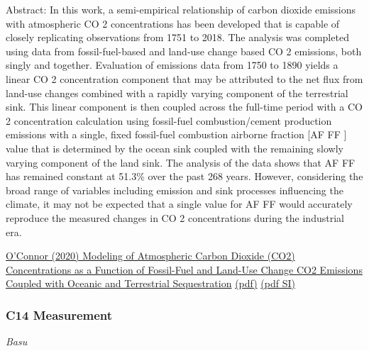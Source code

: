 \documentclass[
]{book}
\begin{document}
Abstract: In this work, a semi-empirical relationship of carbon dioxide emissions with atmospheric
CO 2 concentrations has been developed that is capable of closely replicating observations from 1751
to 2018. The analysis was completed using data from fossil-fuel-based and land-use change based
CO 2 emissions, both singly and together. Evaluation of emissions data from 1750 to 1890 yields a
linear CO 2 concentration component that may be attributed to the net flux from land-use changes
combined with a rapidly varying component of the terrestrial sink. This linear component is then
coupled across the full-time period with a CO 2 concentration calculation using fossil-fuel
combustion/cement production emissions with a single, fixed fossil-fuel combustion airborne
fraction {[}AF FF {]} value that is determined by the ocean sink coupled with the remaining slowly
varying component of the land sink. The analysis of the data shows that AF FF has remained constant
at 51.3\% over the past 268 years. However, considering the broad range of variables including
emission and sink processes influencing the climate, it may not be expected that a single value for
AF FF would accurately reproduce the measured changes in CO 2 concentrations during the industrial
era.

\href{https://www.researchgate.net/publication/341129655_Modeling_of_Atmospheric_Carbon_Dioxide_CO2_Concentrations_as_a_Function_of_Fossil-Fuel_and_Land-Use_Change_CO2_Emissions_Coupled_with_Oceanic_and_Terrestrial_Sequestration}{O'Connor (2020) Modeling of Atmospheric Carbon Dioxide (CO2) Concentrations as a Function of Fossil-Fuel and Land-Use Change CO2 Emissions Coupled with Oceanic and Terrestrial Sequestration}
\href{pdf/OConner_2020_Fossil_CO2_Measurement.pdf}{(pdf)}
\href{pdf/OConner_2020_Fossil_CO2_Measurement_SI.pdf}{(pdf SI)}

\hypertarget{c14-measurement}{%
\subsubsection{C14 Measurement}\label{c14-measurement}}

\emph{Basu}
\end{document}

